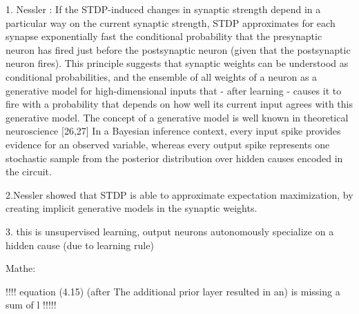 1. Nessler : If the STDP-induced changes in
synaptic strength depend in a particular way on the current
synaptic strength, STDP approximates for each synapse exponentially fast the conditional probability that the presynaptic neuron
has fired just before the postsynaptic neuron (given that the
postsynaptic neuron fires). This principle suggests that synaptic
weights can be understood as conditional probabilities, and the
ensemble of all weights of a neuron as a generative model for high-dimensional inputs that - after learning - causes it to fire with a
probability that depends on how well its current input agrees with
this generative model. The concept of a generative model is well
known in theoretical neuroscience [26,27]
 In a Bayesian inference context, every input
spike provides evidence for an observed variable, whereas every
output spike represents one stochastic sample from the posterior
distribution over hidden causes encoded in the circuit.

2.Nessler showed that STDP is able to approximate expectation maximization, by creating implicit generative models in the synaptic weights.

3. this is unsupervised learning, output neurons autonomously specialize on a hidden cause (due to learning rule)

Mathe:

!!!! equation (4.15) (after The additional prior layer resulted in an) is missing a sum of l !!!!!




